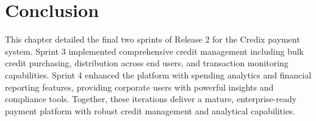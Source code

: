 \section*{Conclusion}

This chapter detailed the final two sprints of Release 2 for the Credix payment system. Sprint 3 implemented comprehensive credit management including bulk credit purchasing, distribution across end users, and transaction monitoring capabilities. Sprint 4 enhanced the platform with spending analytics and financial reporting features, providing corporate users with powerful insights and compliance tools. Together, these iterations deliver a mature, enterprise-ready payment platform with robust credit management and analytical capabilities.
